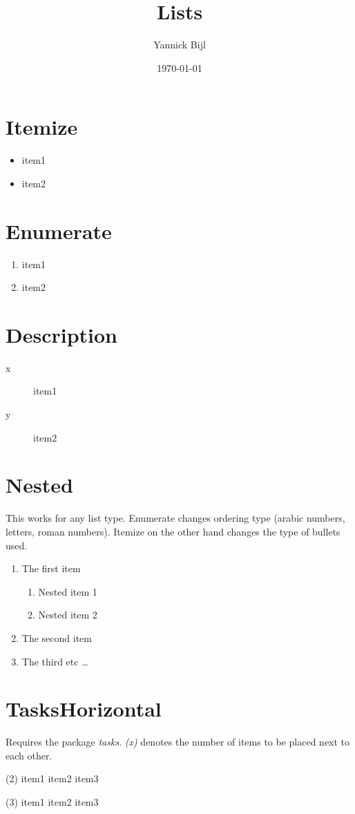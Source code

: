 \documentclass{article}
\title{Lists}
\author{Yannick Bijl}
\date{\today}
\begin{document}
\maketitle

\tableofcontents
\newpage

\section{Itemize}
\begin{itemize}
    \item item1
    \item item2
\end{itemize}

\section{Enumerate}
\begin{enumerate}
    \item item1
    \item item2
\end{enumerate}

\section{Description}
\begin{description}
    \item [x] item1
    \item [y] item2
\end{description}

\section{Nested}
This works for any list type. Enumerate changes ordering type (arabic numbers, letters, roman numbers). Itemize on the other hand changes the type of bullets used.
 
\begin{enumerate}
    \item The first item
  \begin{enumerate}
      \item Nested item 1
      \item Nested item 2
  \end{enumerate}
    \item The second item
    \item The third etc \ldots
\end{enumerate}

\section{Tasks\/Horizontal}
Requires the package \textit{tasks}. \textit{(x)} denotes the number of items to be placed next to each other.

\begin{tasks}(2)
	\task item1
    \task item2
    \task item3
\end{tasks}

\begin{tasks}(3)
	\task item1
    \task item2
    \task item3
\end{tasks}
\end{document}
